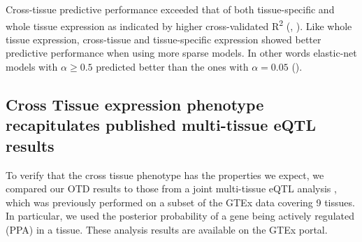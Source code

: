 \documentclass[10pt,letterpaper]{article}
\begin{document}

Cross-tissue predictive performance exceeded that of both tissue-specific and whole tissue expression as indicated by higher cross-validated R\textsuperscript{2} (, ). Like whole tissue expression, cross-tissue and tissue-specific expression showed better predictive performance when using more sparse models. In other words elastic-net models with \(\alpha \geq 0.5\) predicted better than the ones with \(\alpha=0.05\) (). 



\subsection*{Cross Tissue expression phenotype recapitulates published multi-tissue eQTL results}

To verify that the cross tissue phenotype has the properties we expect, we compared our OTD results to those from a joint multi-tissue eQTL analysis  \cite{Flutre_2013}, which was previously performed on a subset of the GTEx data \cite{Ardlie_2015} covering 9 tissues. In particular, we used the posterior probability of a gene being actively regulated  (PPA) in a tissue. These analysis results are available on the GTEx portal.
\end{document}
